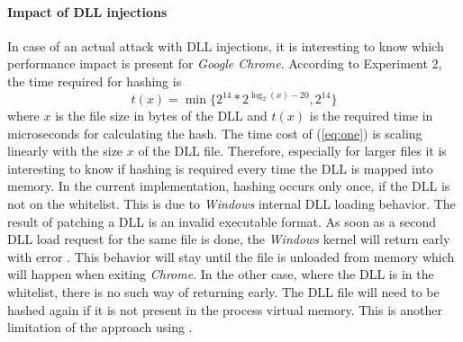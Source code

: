 \paragraph{Impact of \gls{DLL} injections}
In case of an actual attack with \gls{DLL} injections, it is interesting to know which performance impact is present for \emph{Google Chrome}. According to Experiment 2, the time required for hashing is
\begin{equation}
t(x) = \min\{2^{14} * 2^{\log_2(x) - 20}, 2^{14}\} \label{eq:one}
\end{equation}
where $x$ is the file size in bytes of the \gls{DLL} and $t(x)$ is the required time in microseconds for calculating the hash. The time cost of (\ref{eq:one}) is scaling linearly with the size $x$ of the \gls{DLL} file. Therefore, especially for larger files it is interesting to know if hashing is required every time the \gls{DLL} is mapped into memory. In the current implementation, hashing occurs only once, if the \gls{DLL} is not on the whitelist. This is due to \emph{Windows} internal \gls{DLL} loading behavior. The result of patching a \gls{DLL} is an invalid executable format. As soon as a second \gls{DLL} load request for the same file is done, the \emph{Windows} kernel will return early with error . This behavior will stay until the file is unloaded from memory which will happen when exiting \emph{Chrome}. In the other case, where the \gls{DLL} is in the whitelist, there is no such way of returning early. The \gls{DLL} file will need to be hashed again if it is not present in the process virtual memory. This is another limitation of the approach using .